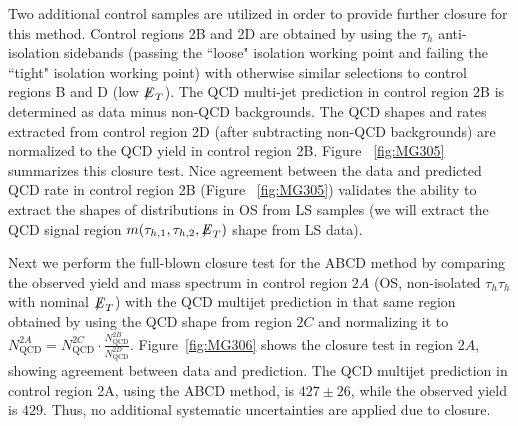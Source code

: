 Two additional control samples are utilized in order to provide further closure for this method. Control regions 2B and 2D are obtained by using
the $\tau_{h}$ anti-isolation sidebands (passing the ``loose" isolation working point and failing the ``tight" isolation working point) with otherwise similar selections
to control regions B and D (low ${\not\mathrel{E}}_T$). The QCD multi-jet prediction in control region 2B is determined as data minus non-QCD backgrounds. The QCD shapes and 
rates extracted from control region 2D (after subtracting non-QCD backgrounds) are normalized to the QCD yield in control region 2B. Figure ~\ref{fig:MG305} 
summarizes this closure test. Nice agreement between the data and predicted QCD rate in control region 2B (Figure ~\ref{fig:MG305}) validates the
ability to extract the shapes of distributions in OS from LS samples (we will extract the QCD signal region $m(\tau_{h,1},\tau_{h,2},{\not\mathrel{E}}_T)$ shape from LS data).

Next we perform the full-blown closure test for the ABCD method by comparing the observed yield and mass spectrum in control region $2A$ (OS, non-isolated $\tau_{h}\tau_{h}$ with nominal ${\not\mathrel{E}}_T$) with the QCD multijet prediction in that same region obtained by using the QCD shape from region $2C$ and normalizing it to $N_{\textrm{QCD}}^{2A} = N_{\textrm{QCD}}^{2C} \cdot \frac{N_{\textrm{QCD}}^{2B}}{N_{\textrm{QCD}}^{2D}}$. Figure~\ref{fig:MG306} shows the closure test in region $2A$, showing agreement between data and prediction. The QCD multijet prediction in control region 2A, using the ABCD method, is $427 \pm 26$, while the observed yield is $429$. Thus, no additional systematic uncertainties are applied due to closure.

